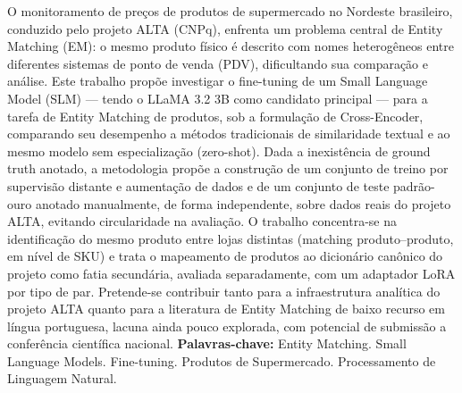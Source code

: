 \documentclass[
    article,
    12pt,
    oneside,
    a4paper,
    english,
    brazilian
    ]{abntex2}
\numberwithin{equation}{section}
\newenvironment{dica}{%
    \par\medskip
    \color{blue!60!black}\small\itshape
}{%
    \par\medskip
}
\begin{document}
\pretextual
\imprimirfolhaderosto
\newpage

\begin{resumo}
%
\noindent O monitoramento de preços de produtos de supermercado no Nordeste brasileiro, conduzido pelo projeto ALTA (CNPq), enfrenta um problema central de Entity Matching (EM): o mesmo produto físico é descrito com nomes heterogêneos entre diferentes sistemas de ponto de venda (PDV), dificultando sua comparação e análise. Este trabalho propõe investigar o fine-tuning de um Small Language Model (SLM) --- tendo o LLaMA 3.2 3B como candidato principal --- para a tarefa de Entity Matching de produtos, sob a formulação de Cross-Encoder, comparando seu desempenho a métodos tradicionais de similaridade textual e ao mesmo modelo sem especialização (zero-shot). Dada a inexistência de ground truth anotado, a metodologia propõe a construção de um conjunto de treino por supervisão distante e aumentação de dados e de um conjunto de teste padrão-ouro anotado manualmente, de forma independente, sobre dados reais do projeto ALTA, evitando circularidade na avaliação. O trabalho concentra-se na identificação do mesmo produto entre lojas distintas (matching produto--produto, em nível de SKU) e trata o mapeamento de produtos ao dicionário canônico do projeto como fatia secundária, avaliada separadamente, com um adaptador LoRA por tipo de par. Pretende-se contribuir tanto para a infraestrutura analítica do projeto ALTA quanto para a literatura de Entity Matching de baixo recurso em língua portuguesa, lacuna ainda pouco explorada, com potencial de submissão a conferência científica nacional.
\newline
\noindent \textbf{Palavras-chave:} Entity Matching. Small Language Models. Fine-tuning. Produtos de Supermercado. Processamento de Linguagem Natural.
\end{resumo}
\end{document}
